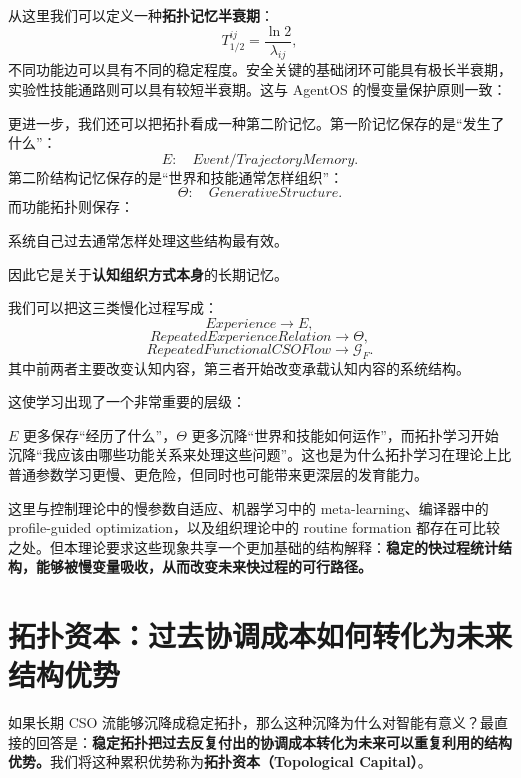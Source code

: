 从这里我们可以定义一种\textbf{拓扑记忆半衰期}：
\[
T_{1/2}^{ij}
=
\frac{\ln 2}{\lambda_{ij}},
\]
不同功能边可以具有不同的稳定程度。安全关键的基础闭环可能具有极长半衰期，实验性技能通路则可以具有较短半衰期。这与 AgentOS 的慢变量保护原则一致：
\begin{statementbox}
\centering
{}
\end{statementbox}

更进一步，我们还可以把拓扑看成一种第二阶记忆。第一阶记忆保存的是``发生了什么''：
\[
E:
\quad
Event/TrajectoryMemory.
\]
第二阶结构记忆保存的是``世界和技能通常怎样组织''：
\[
\Theta:
\quad
GenerativeStructure.
\]
而功能拓扑则保存：
\begin{statementbox}
系统自己过去通常怎样处理这些结构最有效。
\end{statementbox}
因此它是关于\textbf{认知组织方式本身}的长期记忆。

我们可以把这三类慢化过程写成：
\[
Experience
\rightarrow
E,
\]
\[
RepeatedExperienceRelation
\rightarrow
\Theta,
\]
\[
RepeatedFunctionalCSOFlow
\rightarrow
\mathcal{G}_F.
\]
其中前两者主要改变认知内容，第三者开始改变承载认知内容的系统结构。

这使学习出现了一个非常重要的层级：
\begin{statementbox}
\centering
{}
\end{statementbox}
$E$ 更多保存``经历了什么''，$\Theta$ 更多沉降``世界和技能如何运作''，而拓扑学习开始沉降``我应该由哪些功能关系来处理这些问题''。这也是为什么拓扑学习在理论上比普通参数学习更慢、更危险，但同时也可能带来更深层的发育能力。

这里与控制理论中的慢参数自适应、机器学习中的 meta-learning、编译器中的 profile-guided optimization，以及组织理论中的 routine formation 都存在可比较之处。但本理论要求这些现象共享一个更加基础的结构解释：\textbf{稳定的快过程统计结构，能够被慢变量吸收，从而改变未来快过程的可行路径。}


\section{拓扑资本：过去协调成本如何转化为未来结构优势}

如果长期 CSO 流能够沉降成稳定拓扑，那么这种沉降为什么对智能有意义？最直接的回答是：\textbf{稳定拓扑把过去反复付出的协调成本转化为未来可以重复利用的结构优势。}我们将这种累积优势称为\textbf{拓扑资本（Topological Capital）}。

